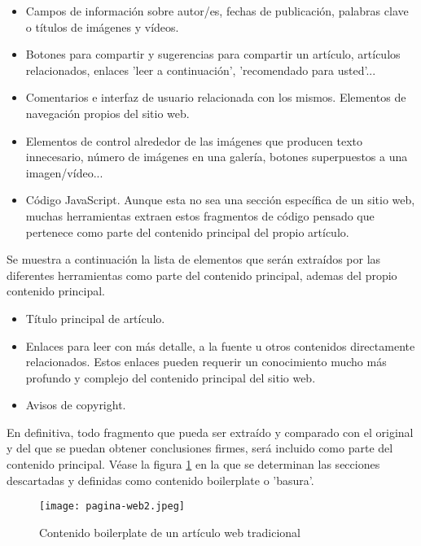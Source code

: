 \begin{itemize}
  \item Campos de información sobre autor/es, fechas de publicación, palabras clave o títulos de imágenes 
  y vídeos.
  \item Botones para compartir y sugerencias para compartir un artículo, artículos relacionados, enlaces 
  'leer a continuación', 'recomendado para usted'...
  \item Comentarios e interfaz de usuario relacionada con los mismos. Elementos de navegación propios del
  sitio web.
  \item Elementos de control alrededor de las imágenes que producen texto innecesario, número de imágenes
  en una galería, botones superpuestos a una imagen/vídeo...
  \item Código JavaScript. Aunque esta no sea una sección específica de un sitio web, muchas herramientas
  extraen estos fragmentos de código pensado que pertenece como parte del contenido principal del propio 
  artículo.
\end{itemize}

Se muestra a continuación la lista de elementos que serán extraídos por las diferentes herramientas como
parte del contenido principal, ademas del propio contenido principal.

\begin{itemize}
  \item Título principal de artículo.
  \item Enlaces para leer con más detalle, a la fuente u otros contenidos directamente relacionados. Estos 
  enlaces pueden requerir un conocimiento mucho más profundo y complejo del contenido principal del sitio 
  web.
  \item Avisos de copyright.
\end{itemize}

En definitiva, todo fragmento que pueda ser extraído y comparado con el original y del que se puedan obtener 
conclusiones firmes, será incluido como parte del contenido principal. Véase la figura 
\ref{img:contenido boilerplate de un articulo web tradicional} en la que se determinan las secciones 
descartadas y definidas como contenido boilerplate o 'basura'.

\begin{figure}[tphb]
  \centering
  \texttt{[image: pagina-web2.jpeg]}
  \caption{Contenido boilerplate de un artículo web tradicional}
  \label{img:contenido boilerplate de un articulo web tradicional}
\end{figure}

